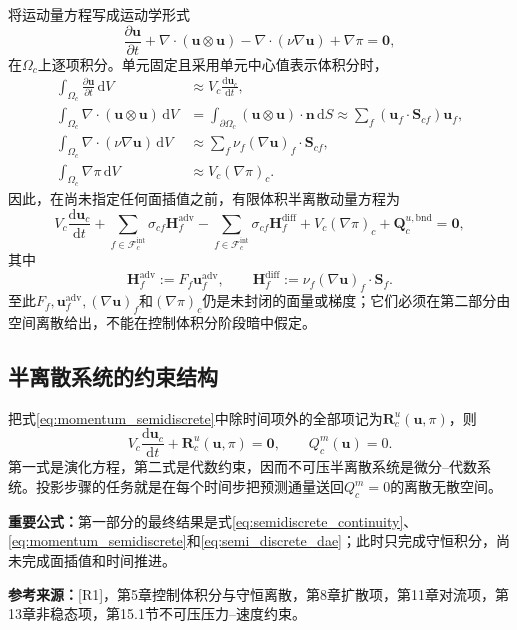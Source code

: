 \documentclass[UTF8,12pt,a4paper]{ctexart}
\numberwithin{equation}{section}
\newcommand{\Rone}{\textnormal{[R1]}}
\newcommand{\source}[1]{\par\smallskip\noindent\colorbox{sourcebg}{%
  \parbox{0.955\linewidth}{\footnotesize\color{sourcegray}\textbf{参考来源：}#1}}\par\smallskip}
\newcommand{\keytitle}[1]{\par\smallskip\noindent\colorbox{keybg}{%
  \parbox{0.965\linewidth}{\color{keyblue}\textbf{重要公式：}#1}}\par\smallskip}
\begin{document}
将运动量方程写成运动学形式
\begin{equation}
  \frac{\partial\bm u}{\partial t}
  +\nabla\cdot(\bm u\otimes\bm u)
  -\nabla\cdot(\nu\nabla\bm u)+\nabla\pi=\bm0,
\end{equation}
在$\Omega_c$上逐项积分。单元固定且采用单元中心值表示体积分时，
\begin{align}
  \int_{\Omega_c}\frac{\partial\bm u}{\partial t}\,\mathrm dV
  &\approx V_c\frac{\mathrm d\bm u_c}{\mathrm dt},\\
  \int_{\Omega_c}\nabla\cdot(\bm u\otimes\bm u)\,\mathrm dV
  &=\int_{\partial\Omega_c}(\bm u\otimes\bm u)\cdot\bm n\,\mathrm dS
  \approx\sum_f(\bm u_f\cdot\bm S_{cf})\bm u_f,\\
  \int_{\Omega_c}\nabla\cdot(\nu\nabla\bm u)\,\mathrm dV
  &\approx\sum_f\nu_f(\nabla\bm u)_f\cdot\bm S_{cf},\\
  \int_{\Omega_c}\nabla\pi\,\mathrm dV
  &\approx V_c(\nabla\pi)_c.
\end{align}
因此，在尚未指定任何面插值之前，有限体积半离散动量方程为
\begin{equation}
  \boxed{V_c\frac{\mathrm d\bm u_c}{\mathrm dt}
  +\sum_{f\in\mathcal F_c^{\mathrm{int}}}\sigma_{cf}\bm H_f^{\mathrm{adv}}
  -\sum_{f\in\mathcal F_c^{\mathrm{int}}}\sigma_{cf}\bm H_f^{\mathrm{diff}}
  +V_c(\nabla\pi)_c+\bm Q_c^{u,\mathrm{bnd}}=\bm0,}
  \label{eq:momentum_semidiscrete}
\end{equation}
其中
\begin{equation}
  \bm H_f^{\mathrm{adv}}:=F_f\bm u_f^{\mathrm{adv}},
  \qquad
  \bm H_f^{\mathrm{diff}}:=\nu_f(\nabla\bm u)_f\cdot\bm S_f.
\end{equation}
至此$F_f,\bm u_f^{\mathrm{adv}},(\nabla\bm u)_f$和$(\nabla\pi)_c$仍是未封闭的面量或梯度；它们必须在第二部分由空间离散给出，不能在控制体积分阶段暗中假定。

\subsection{半离散系统的约束结构}
把式\eqref{eq:momentum_semidiscrete}中除时间项外的全部项记为$\bm R_c^u(\bm u,\pi)$，则
\begin{equation}
  \boxed{V_c\frac{\mathrm d\bm u_c}{\mathrm dt}
  +\bm R_c^u(\bm u,\pi)=\bm0,
  \qquad Q_c^m(\bm u)=0.}
  \label{eq:semi_discrete_dae}
\end{equation}
第一式是演化方程，第二式是代数约束，因而不可压半离散系统是微分--代数系统。投影步骤的任务就是在每个时间步把预测通量送回$Q_c^m=0$的离散无散空间。
\keytitle{第一部分的最终结果是式\eqref{eq:semidiscrete_continuity}、\eqref{eq:momentum_semidiscrete}和\eqref{eq:semi_discrete_dae}；此时只完成守恒积分，尚未完成面插值和时间推进。}
\source{\Rone，第5章控制体积分与守恒离散，第8章扩散项，第11章对流项，第13章非稳态项，第15.1节不可压压力--速度约束。}
\end{document}
